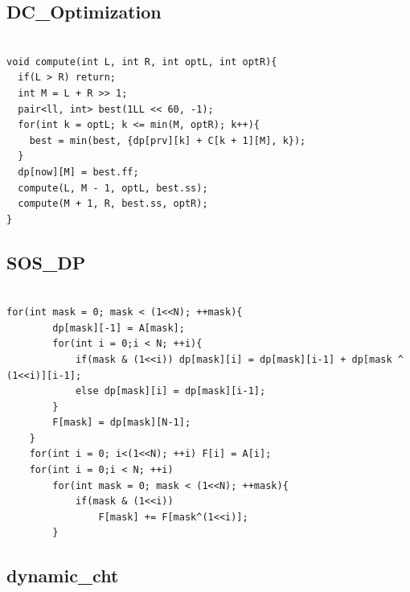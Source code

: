 \documentclass[9pt, landscape, a4paper,twosided]{extarticle}
\begin{document}
\begin{multicols*}{3}
\subsection{DC\_Optimization}
\begin{verbatim}

void compute(int L, int R, int optL, int optR){
  if(L > R) return;
  int M = L + R >> 1;
  pair<ll, int> best(1LL << 60, -1);
  for(int k = optL; k <= min(M, optR); k++){
    best = min(best, {dp[prv][k] + C[k + 1][M], k});
  }
  dp[now][M] = best.ff;
  compute(L, M - 1, optL, best.ss);
  compute(M + 1, R, best.ss, optR);
}
\end{verbatim}

\subsection{SOS\_DP}
\begin{verbatim}

for(int mask = 0; mask < (1<<N); ++mask){
        dp[mask][-1] = A[mask];
        for(int i = 0;i < N; ++i){
            if(mask & (1<<i)) dp[mask][i] = dp[mask][i-1] + dp[mask ^ (1<<i)][i-1];
            else dp[mask][i] = dp[mask][i-1];
        }
        F[mask] = dp[mask][N-1];
    }
    for(int i = 0; i<(1<<N); ++i) F[i] = A[i];
    for(int i = 0;i < N; ++i)
        for(int mask = 0; mask < (1<<N); ++mask){
            if(mask & (1<<i))
                F[mask] += F[mask^(1<<i)];
        }
\end{verbatim}

\subsection{dynamic\_cht}
\begin{verbatim}


\end{verbatim}
\end{multicols*}
\end{document}
